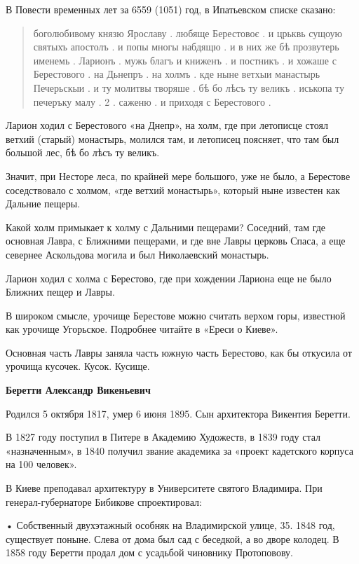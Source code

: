 В Повести временных лет за 6559 (1051) год, в Ипатьевском списке сказано:

\begin{quotation}
боголюбивому князю Ярославу . любяще Берестовоє . и црьквь сущоую святыхъ апостолъ . и попы многы набдящю . и в них же бѣ прозвутерь именемь . Ларионъ . мужь благъ и книженъ . и постникъ . и хожаше с Берестового . на Дьнепръ . на холмъ . кде ныне ветхыи манастырь Печерьскыи . и ту молитвы творяше . бѣ бо лѣсъ ту великъ . иськопа ту печеръку малу . 2 . саженю . и приходя с Берестового .
\end{quotation}

Ларион ходил с Берестового «на Днепр», на холм, где при летописце стоял ветхий (старый) монастырь, молился там, и летописец поясняет, что там был большой лес, бѣ бо лѣсъ ту великъ.

Значит, при Несторе леса, по крайней мере большого, уже не было, а Берестове соседствовало с холмом, «где ветхий монастырь», который ныне известен как Дальние пещеры.

Какой холм примыкает к холму с Дальними пещерами? Соседний, там где основная Лавра, с Ближними пещерами, и где вне Лавры церковь Спаса, а еще севернее Аскольдова могила и был Николаевский монастырь.

Ларион ходил с холма с Берестово, где при хождении Лариона еще не было Ближних пещер и Лавры.

В широком смысле, урочище Берестове можно считать верхом горы, известной как урочище Угорьское. Подробнее читайте в «Ереси о Киеве». 

Основная часть Лавры заняла часть южную часть Берестово, как бы откусила от урочища кусочек. Кусок. Кусище.\\

\medskip


\textbf{Беретти Александр Викеньевич}

Родился 5 октября 1817, умер 6 июня 1895. Сын архитектора Викентия Беретти.

В 1827 году поступил в Питере в Академию Художеств, в 1839 году стал «назначенным», в 1840 получил звание академика за «проект кадетского корпуса на 100 человек».

В Киеве преподавал архитектуру в Университете святого Владимира. При генерал-губер\-наторе Бибикове спроектировал:

\noindent • Собственный двухэтажный особняк на Владимирской улице, 35. 1848 год, существует поныне. Слева от дома был сад с беседкой, а во дворе колодец. В 1858 году Беретти продал дом с усадьбой чиновнику Протоповову.

